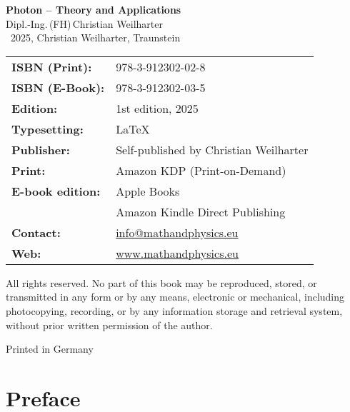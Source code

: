 \cleardoublepage
\thispagestyle{empty}
\begin{center}
	
	{\Large\textbf{Photon – Theory and Applications}}\\[1.2em]
	{\large Dipl.-Ing.\,(FH)\,Christian Weilharter}\\[1.2em]
	\textcopyright~2025, Christian Weilharter, Traunstein\\[2em]
\end{center}

\begin{flushleft}
	\begin{tabular}{@{}l l}
		\textbf{ISBN (Print):} & 978-3-912302-02-8 \\[0.5em]
		\textbf{ISBN (E-Book):} & 978-3-912302-03-5 \\[0.5em]
		\textbf{Edition:} & 1st edition, 2025 \\[0.5em]
		\textbf{Typesetting:} & \LaTeX \\[0.5em]
		\textbf{Publisher:} & Self-published by Christian Weilharter \\[0.5em]

		\textbf{Print:} & Amazon KDP (Print-on-Demand) \\[0.5em]
		\textbf{E-book edition:} & Apple Books \\[0.5em]
		& Amazon Kindle Direct Publishing \\[0.5em]
		\textbf{Contact:} & \href{mailto:info@mathandphysics.de}{info@mathandphysics.eu} \\[0.5em]
		\textbf{Web:} & \href{https://www.mathandphysics.de}{www.mathandphysics.eu} \\

	\end{tabular}
\end{flushleft}

\vspace{2em}
\noindent
All rights reserved. No part of this book may be reproduced, stored, or transmitted
in any form or by any means, electronic or mechanical, including photocopying,
recording, or by any information storage and retrieval system, without prior written
permission of the author.

\begin{center}\small Printed in Germany\end{center}

\cleardoublepage


\chapter*{Preface}



